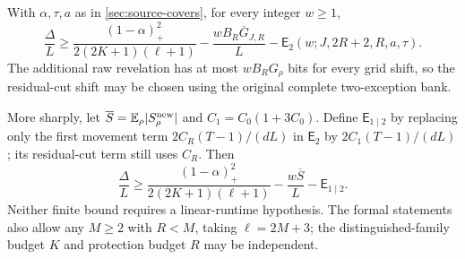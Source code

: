 \begin{proposition}\label{prop:finite-sharing}
With $\alpha,\tau,a$ as in \cref{sec:source-covers}, for every integer
$w\ge1$,
\begin{equation}\label{eq:finite-sharing}
 \frac\Delta L\ge
 \frac{(1-\alpha)_+^2}{2(2K+1)(\ell+1)}
 -\frac{wB_R\overline G_{J,R}}L
 -\mathsf E_2(w;J,2R+2,R,a,\tau).
\end{equation}
The additional raw revelation has at most $wB_RG_\rho$ bits for every
grid shift, so the residual-cut shift may be chosen using the original
complete two-exception bank.

More sharply, let $\overline S=\mathbb E_\rho|S^{\rm new}_\rho|$ and
$C_1=C_0(1+3C_0)$. Define $\mathsf E_{1\mid2}$ by replacing only the
first movement term $2C_R(T-1)/(dL)$ in $\mathsf E_2$ by
$2C_1(T-1)/(dL)$; its residual-cut term still uses $C_R$. Then
\[
 \frac\Delta L\ge
 \frac{(1-\alpha)_+^2}{2(2K+1)(\ell+1)}
 -\frac{w\overline S}L-\mathsf E_{1\mid2}.
\]
Neither finite bound requires a linear-runtime hypothesis. The formal
statements also allow any $M\ge2$ with $R<M$, taking $\ell=2M+3$;
the distinguished-family budget $K$ and protection budget $R$ may be
independent.
\end{proposition}
